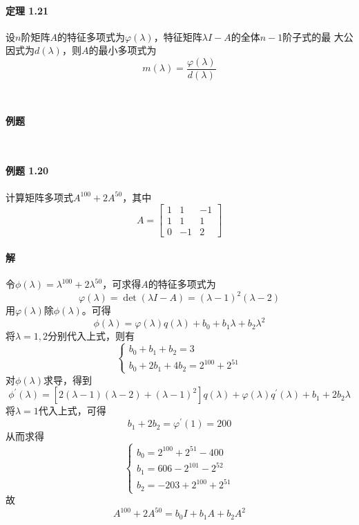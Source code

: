 \documentclass[12pt, a4paper, oneside, fontset=none]{ctexart}
\begin{document}
\paragraph*{定理 1.21} 设$n$阶矩阵$A$的特征多项式为$\varphi(\lambda)$，特征矩阵$\lambda I - A$的全体$n - 1$阶子式的最
大公因式为$d(\lambda)$，则$A$的最小多项式为
\[
    m(\lambda) = \dfrac{\varphi(\lambda)}{d(\lambda)}
\]
\par \ \par

\centerline{\large{\textbf{例题}}} \ \par

\paragraph*{例题 1.20} 计算矩阵多项式$A^{100} + 2A^{50}$，其中
\begin{equation*}
    A = \begin{bmatrix}
        1 & 1  & -1 \\
        1 & 1  & 1  \\
        0 & -1 & 2
    \end{bmatrix}
\end{equation*}

\paragraph*{解} 令$\phi(\lambda) = \lambda^{100} + 2\lambda^{50}$，可求得$A$的特征多项式为
\[
    \varphi(\lambda) = \det(\lambda I - A) = (\lambda - 1)^2(\lambda-2)
\]
用$\varphi(\lambda)$除$\phi(\lambda)$。可得
\[
    \phi(\lambda) = \varphi(\lambda)q(\lambda) + b_0 + b_1 \lambda + b_2\lambda^2
\]
将$\lambda = 1, 2$分别代入上式，则有
\begin{equation*}
    \begin{cases}
        b_0 + b_1 + b_2 = 3 \\
        b_0 + 2b_1 + 4b_2 = 2^{100} + 2^{51}
    \end{cases}
\end{equation*}
对$\phi(\lambda)$求导，得到
\[
    \phi^{'}(\lambda) = [2(\lambda - 1)(\lambda - 2) + (\lambda - 1)^2]q(\lambda) + \varphi(\lambda)q^{'}(\lambda) + b_1 + 2b_2 \lambda
\]
将$\lambda = 1$代入上式，可得
\[
    b_1 + 2b_2 = \varphi^{'}(1) = 200
\]
从而求得
\[
    \begin{cases}
        b_0 = 2^{100} + 2^{51} - 400 \\
        b_1 = 606 - 2^{101} - 2^{52} \\
        b_2 = -203 + 2^{100} + 2^{51}
    \end{cases}
\]
故
\[
    A^{100} + 2A^{50} = b_0 I + b_1 A + b_2 A^2
\]
\end{document}

